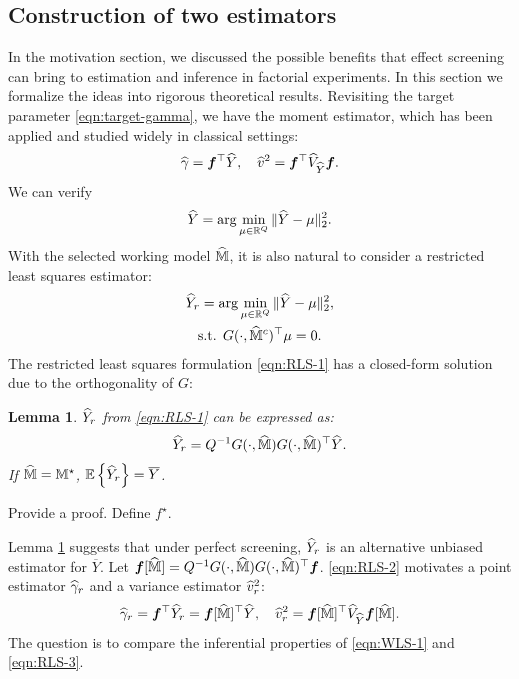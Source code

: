 \documentclass[12pt]{article}
\newtheorem{lemma}{Lemma}
\begin{document}
\subsection{Construction of two estimators}
In the motivation section, we discussed the possible benefits that effect screening can bring to estimation and inference in factorial experiments. In this section we formalize the ideas into rigorous theoretical results. Revisiting the target parameter \eqref{eqn:target-gamma}, we have the  moment estimator, which has been applied and studied widely in classical settings:
\begin{align}\label{eqn:WLS-1}
    {\widehat{\gamma}} = {\boldsymbol{f}}^\top {\widehat{Y}}, \quad {\widehat{v}}^2 = {\boldsymbol{f}}^\top {\widehat{V}}_{{\widehat{Y}}} {\boldsymbol{f}}.
\end{align}
We can verify
\begin{align*}
    {\widehat{Y}} = \arg\min_{\mu\in{\mathbb{R}}^Q} \|{\widehat{Y}} - \mu\|_2^2.
\end{align*}
With the selected working model $
\widehat{{\mathbb{M}}}$, it is also natural to consider a restricted least squares estimator:
\begin{gather}
    {\widehat{Y}}_r = \arg\min_{\mu\in{\mathbb{R}}^Q} \|{\widehat{Y}} - \mu\|_2^2,\label{eqn:RLS-1}\\
    \text{s.t. } G(\cdot,  {\widehat{{\mathbb{M}}}^c})^\top \mu = 0.
\end{gather}
The restricted least squares formulation \eqref{eqn:RLS-1} has a closed-form solution due to the orthogonality of $G$:
\begin{lemma}\label{lem:RLS}
${\widehat{Y}}_r$ from \eqref{eqn:RLS-1} can be expressed as:
\begin{align}\label{eqn:RLS-2}
    {\widehat{Y}}_r = Q^{-1}G(\cdot,  {\widehat{{\mathbb{M}}}})G(\cdot,  {\widehat{{\mathbb{M}}}})^\top {\widehat{Y}}.
\end{align}
If $\widehat{{\mathbb{M}}} = {\mathbb{M}}^\star$, ${{\mathbb{E}}\left\{{\widehat{Y}}_r\right\}}= \overline{Y}$.
\end{lemma}
{
\color{red}
Provide a proof. Define $f^\star$. 
}

Lemma \ref{lem:RLS} suggests that under perfect screening, ${\widehat{Y}}_r$ is an alternative unbiased estimator for $\overline{Y}$. Let ${\boldsymbol{f}}[\widehat{{\mathbb{M}}}] = Q^{-1}G(\cdot,  {\widehat{{\mathbb{M}}}})G(\cdot,  {\widehat{{\mathbb{M}}}})^\top{\boldsymbol{f}}$. \eqref{eqn:RLS-2} motivates a point estimator ${\widehat{\gamma}}_r$ and a variance estimator ${\widehat{v}}_r^2$:
\begin{align}\label{eqn:RLS-3}
    {\widehat{\gamma}}_r = {\boldsymbol{f}}^\top {\widehat{Y}}_r = {\boldsymbol{f}}[\widehat{{\mathbb{M}}}]^\top{\widehat{Y}}, \quad {\widehat{v}}_r^2 = {\boldsymbol{f}}[\widehat{{\mathbb{M}}}]^\top {\widehat{V}}_{\widehat{Y}} {\boldsymbol{f}}[\widehat{{\mathbb{M}}}]. 
\end{align}
The question is to compare the inferential properties of \eqref{eqn:WLS-1} and \eqref{eqn:RLS-3}. 
\end{document}

